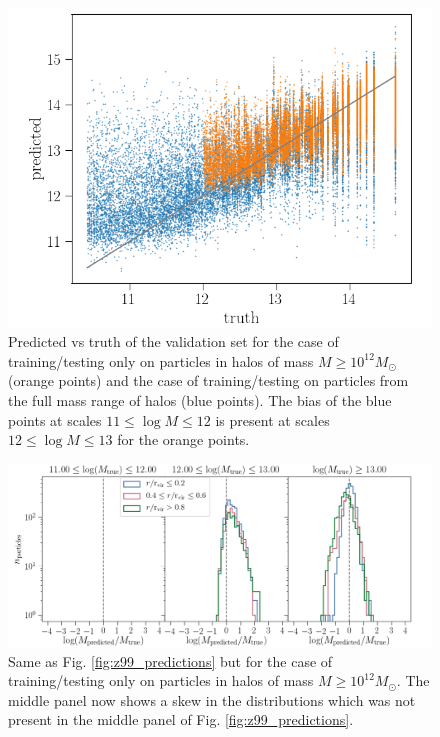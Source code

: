 \documentclass[11pt]{article}
\begin{document}
\begin{figure}[t]
\centering
\includegraphics[width=0.85\columnwidth]{pred.png}
\caption{Predicted vs truth of the validation set for the case of training/testing only on particles in halos of mass $M\geq 10^{12} M_\odot$ (orange points) and the case of training/testing on particles from the full mass range of halos (blue points). The bias of the blue points at scales $11 \leq \log M \leq 12$ is present at scales $12 \leq \log M \leq 13$ for the orange points.}
\label{fig:pred_1e12}
\end{figure}

\begin{figure}[t]
\centering
\includegraphics[width=0.85\columnwidth]{radii_hist_above1e12.png}
\caption{Same as Fig. \ref{fig:z99_predictions} but for the case of training/testing only on particles in halos of mass $M\geq 10^{12} M_\odot$. The middle panel now shows a skew in the distributions which was not present in the middle panel of Fig. \ref{fig:z99_predictions}.}
\label{fig:radii_hist_above1e12}
\end{figure}
 
\end{document}
